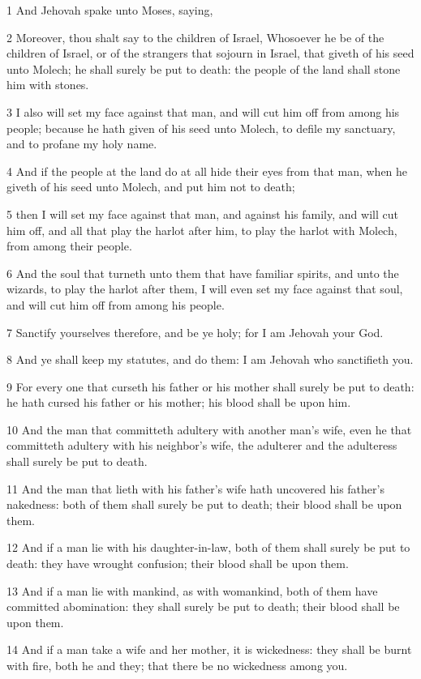 \par 1 And Jehovah spake unto Moses, saying,
\par 2 Moreover, thou shalt say to the children of Israel, Whosoever he be of the children of Israel, or of the strangers that sojourn in Israel, that giveth of his seed unto Molech; he shall surely be put to death: the people of the land shall stone him with stones.
\par 3 I also will set my face against that man, and will cut him off from among his people; because he hath given of his seed unto Molech, to defile my sanctuary, and to profane my holy name.
\par 4 And if the people at the land do at all hide their eyes from that man, when he giveth of his seed unto Molech, and put him not to death;
\par 5 then I will set my face against that man, and against his family, and will cut him off, and all that play the harlot after him, to play the harlot with Molech, from among their people.
\par 6 And the soul that turneth unto them that have familiar spirits, and unto the wizards, to play the harlot after them, I will even set my face against that soul, and will cut him off from among his people.
\par 7 Sanctify yourselves therefore, and be ye holy; for I am Jehovah your God.
\par 8 And ye shall keep my statutes, and do them: I am Jehovah who sanctifieth you.
\par 9 For every one that curseth his father or his mother shall surely be put to death: he hath cursed his father or his mother; his blood shall be upon him.
\par 10 And the man that committeth adultery with another man's wife, even he that committeth adultery with his neighbor's wife, the adulterer and the adulteress shall surely be put to death.
\par 11 And the man that lieth with his father's wife hath uncovered his father's nakedness: both of them shall surely be put to death; their blood shall be upon them.
\par 12 And if a man lie with his daughter-in-law, both of them shall surely be put to death: they have wrought confusion; their blood shall be upon them.
\par 13 And if a man lie with mankind, as with womankind, both of them have committed abomination: they shall surely be put to death; their blood shall be upon them.
\par 14 And if a man take a wife and her mother, it is wickedness: they shall be burnt with fire, both he and they; that there be no wickedness among you.
